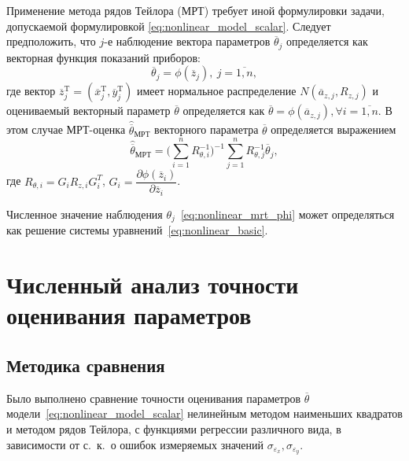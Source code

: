 Применение метода рядов Тейлора (МРТ) требует иной формулировки задачи,
допускаемой формулировкой \eqref{eq:nonlinear_model_scalar}.
Следует предположить, что \( j \)-е наблюдение вектора параметров \( \overline{\theta}_j \)
определяется как векторная функция показаний приборов:
\begin{equation}
  \label{eq:nonlinear_mrt_phi}
  \overline{\theta}_j = \phi( \overline{z}_{j} ), \: j = \overline{1, n},
\end{equation}
где вектор
\( \overline{z}^{\text{T}}_{j} =
( \overline{x}^{\text{T}}_{j}, \overline{y}^{\text{T}}_{j}) \)
имеет нормальное распределение \( N(\overline{a}_{z,j}, R_{z,j}) \)
и оцениваемый векторный параметр \( \overline{\theta} \) определяется как
\( \overline{\theta} = \phi(\overline{a}_{z,j}), \forall i = \overline{1, n} \).
В этом случае МРТ-оценка \( \hat{\overline{\theta}}_{\text{МРТ}} \) векторного параметра \( \overline{\theta} \)
определяется выражением
\begin{equation*}
  \hat{\overline{\theta}}_{\text{МРТ}} =
  \Bigg( \sum^{n}_{i=1} R^{-1}_{\theta,i} \Bigg)^{-1}
  \sum^{n}_{j=1} R^{-1}_{\theta,j} \overline{\theta}_j,
\end{equation*}
где
\( R_{\theta,i} = G_i R_{z,i} G^T_i \),
\( G_i =
\dfrac{\partial \phi( \overline{z}_{i} ) }{ \partial \overline{z}_{i} } \).

Численное значение наблюдения \( \theta_j \)~\eqref{eq:nonlinear_mrt_phi} может определяться как
решение системы уравнений~\eqref{eq:nonlinear_basic}.


\section{Численный анализ точности оценивания параметров}

\subsection{Методика сравнения}\label{subsec:nonlinear_comparison_conditions}

Было выполнено сравнение точности оценивания параметров \( \overline{\theta} \)
модели~\eqref{eq:nonlinear_model_scalar}
нелинейным методом наименьших квадратов и методом рядов Тейлора,
с функциями регрессии различного вида,
в зависимости от с.~к.~о ошибок измеряемых значений
\( \sigma_{\varepsilon_x}, \sigma_{\varepsilon_y} \).

